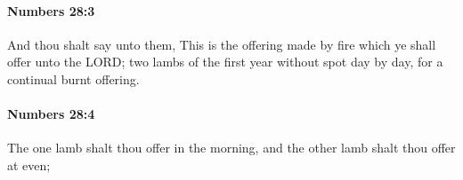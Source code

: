 		\paragraph{Numbers 28:3} %
			\label{NUMBERS-28-3}

			And thou shalt say unto them, This is the offering made by fire which ye shall offer unto the LORD; two lambs of the first year without spot day by day, for a continual burnt offering.


		\paragraph{Numbers 28:4} %
			\label{NUMBERS-28-4}

			The one lamb shalt thou offer in the morning, and the other lamb shalt thou offer at even;


